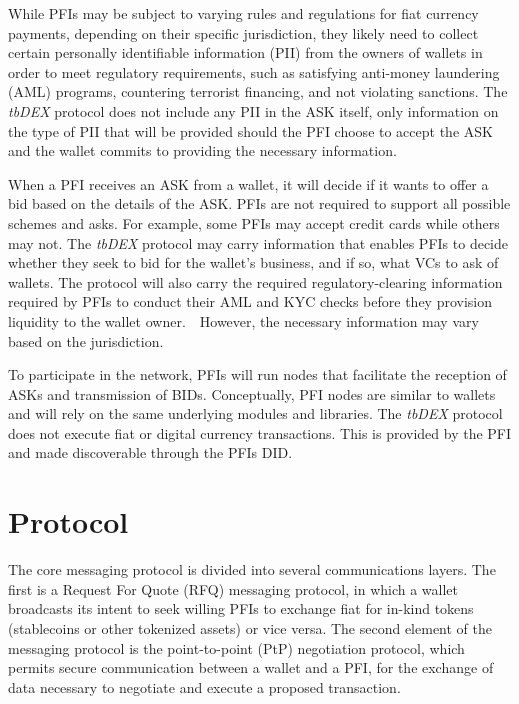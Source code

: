 \documentclass[11pt]{article}
\begin{document}
\vspace{1\baselineskip}
While PFIs may be subject to varying rules and regulations for fiat currency payments, depending on their specific jurisdiction, they likely need to collect certain personally identifiable information (PII) from the owners of wallets in order to meet regulatory requirements, such as satisfying anti-money laundering (AML) programs, countering terrorist financing, and not violating sanctions.  The \textit{tbDEX }protocol does not include any PII in the ASK itself, only information on the type of PII that will be provided should the PFI choose to accept the ASK and the wallet commits to providing the necessary information. 

\vspace{1\baselineskip}
When a PFI receives an ASK from a wallet, it will decide if it wants to offer a bid based on the details of the ASK. PFIs are not required to support all possible schemes and asks.  For example, some PFIs may accept credit cards while others may not.  The \textit{tbDEX }protocol may carry information that enables PFIs to decide whether they seek to bid for the wallet’s business, and if so, what VCs to ask of wallets.  The protocol will also carry the required regulatory-clearing information required by PFIs to conduct their AML and KYC checks before they provision liquidity to the wallet owner.\ \ However, the necessary information may vary based on the jurisdiction. 

\vspace{1\baselineskip}
To participate in the network, PFIs will run nodes that facilitate the reception of ASKs and transmission of BIDs. Conceptually, PFI nodes are similar to wallets and will rely on the same underlying modules and libraries. The \textit{tbDEX }protocol does not execute fiat or digital currency transactions. This is provided by the PFI and made discoverable through the PFIs DID.  

\vspace{1\baselineskip}
\section{Protocol}

\vspace{1\baselineskip}
The core messaging protocol is divided into several communications layers. The first is a Request For Quote (RFQ) messaging protocol, in which a wallet broadcasts its intent to seek willing PFIs to exchange fiat for in-kind tokens (stablecoins or other tokenized assets) or vice versa. The second element of the messaging protocol is the point-to-point (PtP) negotiation protocol, which permits secure communication between a wallet and a PFI, for the exchange of data necessary to negotiate and execute a proposed transaction.  
\end{document}
